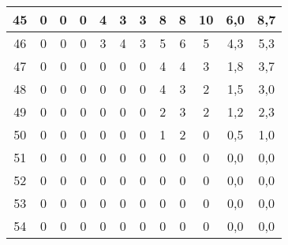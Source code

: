 \begin{center}
\begin{longtable}{|c|c|c|c|c|c|c|c|c|c|c|c|}
		45 & 0 & 0 & 0 & 4  & 3  & 3  & 8   & 8   & 10  & 6,0      & 8,7    \\ \hline
		46 & 0 & 0 & 0 & 3  & 4  & 3  & 5   & 6   & 5   & 4,3      & 5,3    \\ \hline
		47 & 0 & 0 & 0 & 0  & 0  & 0  & 4   & 4   & 3   & 1,8      & 3,7    \\ \hline
		48 & 0 & 0 & 0 & 0  & 0  & 0  & 4   & 3   & 2   & 1,5      & 3,0    \\ \hline
		49 & 0 & 0 & 0 & 0  & 0  & 0  & 2   & 3   & 2   & 1,2      & 2,3    \\ \hline
		50 & 0 & 0 & 0 & 0  & 0  & 0  & 1   & 2   & 0   & 0,5      & 1,0    \\ \hline
		51 & 0 & 0 & 0 & 0  & 0  & 0  & 0   & 0   & 0   & 0,0      & 0,0    \\ \hline
		52 & 0 & 0 & 0 & 0  & 0  & 0  & 0   & 0   & 0   & 0,0      & 0,0    \\ \hline
		53 & 0 & 0 & 0 & 0  & 0  & 0  & 0   & 0   & 0   & 0,0      & 0,0    \\ \hline
		54 & 0 & 0 & 0 & 0  & 0  & 0  & 0   & 0   & 0   & 0,0      & 0,0    \\ \hline
	\end{longtable}
\end{center}


